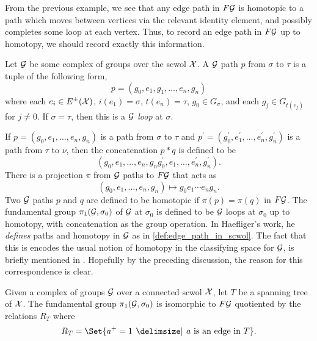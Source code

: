 From the previous example, we see that any edge path in $F\mathcal{G}$ is homotopic to a path which moves between vertices via the relevant identity element, and possibly completes some loop at each vertex.
Thus, to record an edge path in $F\mathcal{G}$ up to homotopy, we should record exactly this information.

\begin{definition}
	Let $\mathcal{G}$ be some complex of groups over the scwol $\mathcal{X}$.
	A $\mathcal{G}$ path $p$ from $\sigma$ to  $\tau$ is a tuple of the following form,
	\[
		p = (g_0, e_1, g_1, \ldots ,e_n, g_n)
	\]
	where each $e_i \in E^\pm(\mathcal{X})$, $i(e_1) = \sigma$, $t(e_n)=\tau$, $g_0 \in G_\sigma$, and each $g_j \in G_{t(e_j)}$ for  $j \neq 0$.
	If $\sigma=\tau$, then this is a \emph{ $\mathcal{G}$ loop} at  $\sigma$.
	\label{def:paths_in_complexes_of_groups}
\end{definition}

If $p = (g_0, e_1, \ldots, e_n, g_n)$ is a path from $\sigma$ to  $\tau$ and  $p^\prime = (g^\prime_0, e^\prime_1, \ldots, e^\prime_n, g^\prime_n)$ is a path from $\tau$ to $\nu$, then the concatenation  $p \ast q$ is defined to be
\[
	(g_0, e_1, \ldots, e_n, g_ng^\prime_0, e_1, \ldots, e^\prime_n, g^\prime_n)
	.\]
There is a projection $\pi$ from $\mathcal{G}$ paths to $F\mathcal{G}$ that acts as
\[
	(g_0, e_1, \ldots, e_n, g_n) \mapsto g_0e_1\cdots e_ng_n
	.\]
Two $\mathcal{G}$ paths  $p$ and $q$ are defined to be homotopic if $\pi(p) = \pi(q)$ in $F\mathcal{G}$.
The fundamental group $\pi_1(\mathcal{G}, \sigma_0)$ of $\mathcal{G}$ at $\sigma_0$ is defined to be $\mathcal{G}$ loops at  $\sigma_0$ up to homotopy, with concatenation as the group operation.
In Haefliger's work, he \emph{defines} paths and homotopy in $\mathcal{G}$ as in \cref{def:edge_path_in_scwol}.
The fact that this is encodes the usual notion of homotopy in the classifying space for $\mathcal{G}$, is briefly mentioned in \cite[Section 3.1.a]{haefliger_complexes_1991}.
Hopefully by the preceding discussion, the reason for this correspondence is clear.
\begin{theorem}
	Given a complex of groups $\mathcal{G}$ over a connected scwol  $\mathcal{X}$, let $T$ be a spanning tree of  $\mathcal{X}$.
	The fundamental group  $\pi_1(\mathcal{G}, \sigma_0)$ is isomorphic to $F\mathcal{G}$ quotiented by the relations  $R_T$ where
	\[
		R_T = \Set{a^+ = 1 \given a \text{ is an edge in } T}
		.\]
\end{theorem}
